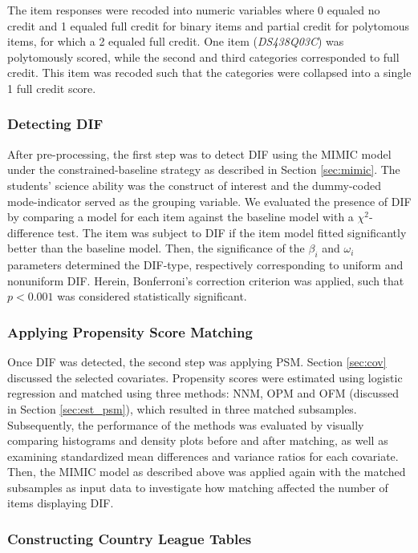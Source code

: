 \documentclass{article}
\begin{document}
The item responses were recoded into numeric variables where 0 equaled no credit and 1 equaled full credit for binary items and partial credit for polytomous items, for which a 2 equaled full credit. One item (\textit{DS438Q03C}) was polytomously scored, while the second and third categories corresponded to full credit. This item was recoded such that the categories were collapsed into a single 1 full credit score. 

\subsubsection{Detecting DIF}

After pre-processing, the first step was to detect DIF using the MIMIC model under the constrained-baseline strategy as described in Section \ref{sec:mimic}. The students' science ability was the construct of interest and the dummy-coded mode-indicator served as the grouping variable. We evaluated the presence of DIF by comparing a model for each item against the baseline model with a $\chi^2$-difference test. The item was subject to DIF if the item model fitted significantly better than the baseline model. Then, the significance of the $\beta_i$ and $\omega_i$ parameters determined the DIF-type, respectively corresponding to uniform and nonuniform DIF. Herein, Bonferroni's correction criterion was applied, such that $p < 0.001$ was considered statistically significant.

\subsubsection{Applying Propensity Score Matching}

Once DIF was detected, the second step was applying PSM. Section \ref{sec:cov} discussed the selected covariates. Propensity scores were estimated using logistic regression and matched using three methods: NNM, OPM and OFM (discussed in Section \ref{sec:est_psm}), which resulted in three matched subsamples. Subsequently, the performance of the methods was evaluated by visually comparing histograms and density plots before and after matching, as well as examining standardized mean differences and variance ratios for each covariate. Then, the MIMIC model as described above was applied again with the matched subsamples as input data to investigate how matching affected the number of items displaying DIF.

\subsubsection{Constructing Country League Tables}
\end{document}
